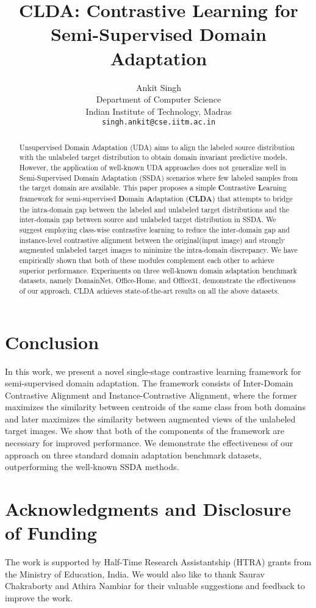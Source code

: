\documentclass{article}
\title{CLDA: Contrastive Learning for Semi-Supervised Domain Adaptation}
\author{%
  Ankit Singh \\
  Department of Computer Science\\
  Indian Institute of Technology, Madras \\
  \texttt{singh.ankit@cse.iitm.ac.in} \\
}
\begin{document}
\maketitle

\begin{abstract}
Unsupervised Domain Adaptation (UDA) aims to align the labeled source distribution with the unlabeled target distribution to obtain domain invariant predictive models. However, the application of well-known UDA approaches does not generalize well in Semi-Supervised Domain Adaptation (SSDA) scenarios where few labeled samples from the target domain are available.
This paper proposes a simple \textbf{C}ontrastive \textbf{L}earning framework for semi-supervised \textbf{D}omain \textbf{A}daptation (\textbf{CLDA}) that attempts to bridge the intra-domain gap between the labeled and unlabeled target distributions and the inter-domain gap between source and unlabeled target distribution in SSDA. We suggest employing class-wise contrastive learning to reduce the inter-domain gap and instance-level contrastive alignment between the original(input image) and strongly augmented unlabeled target images to minimize the intra-domain discrepancy. We have empirically shown that both of these modules complement each other to achieve superior performance. Experiments on three well-known domain adaptation benchmark datasets, namely DomainNet, Office-Home, and Office31, demonstrate the effectiveness of our approach. CLDA achieves state-of-the-art results on all the above datasets.
\end{abstract}









\section{Conclusion}
In this work, we present a novel single-stage contrastive learning framework for semi-supervised domain adaptation. The framework consists of Inter-Domain Contrastive Alignment and Instance-Contrastive Alignment, where the former maximizes the similarity between centroids of the same class from both domains and later maximizes the similarity between augmented views of the unlabeled target images. We show that both of the components of the framework are necessary for improved performance. We demonstrate the effectiveness of our approach on three standard domain adaptation benchmark datasets, outperforming the well-known SSDA methods.

\section{Acknowledgments and Disclosure of Funding}
The work is supported by Half-Time Research Assistantship (HTRA) grants from the Ministry of Education, India. We would also like to thank Saurav Chakraborty and  Athira Nambiar for their valuable suggestions and feedback to improve the work.
\printbibliography
\nocite{*}

\newpage
\appendix

\end{document}
